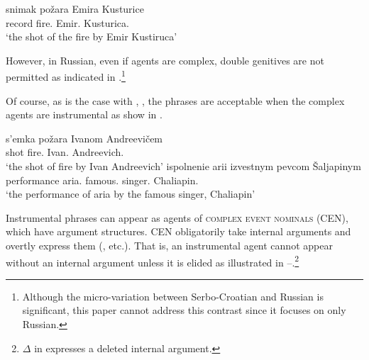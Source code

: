 \documentclass[output=paper,
]{langscibook}
\begin{document}
\begin{exe}
\ex\label{dgsc} %
\gll snimak požara Emira Kusturice\\
	record fire.{\GEN} Emir.{\GEN} Kusturica.{\GEN}\\
\trans `the shot of the fire by Emir Kustiruca'
\end{exe}

\noindent
However, in Russian, even if agents are complex, double genitives are not permitted as indicated in .\footnote{
			Although the micro-variation between Serbo-Croatian  and Russian  is significant, this paper cannot address this contrast since it focuses on only Russian.}

\begin{exe}
\ex\label{dgr} %
\begin{xlist}
\end{xlist}
\end{exe}

\noindent
Of course, as is the case with , , the phrases are acceptable when the complex agents are instrumental as show in .

\begin{exe}
\ex\label{gicom} %
\begin{xlist}
\ex
\gll s'emka požara Ivanom Andreevičem\\
	shot fire.{\GEN}	Ivan.{\INS} Andreevich.{\INS}\\
\trans  `the shot of fire by Ivan Andreevich' 
\ex
\gll ispolnenie arii izvestnym	 pevcom Šaljapinym\\
	performance aria.{\GEN} famous.{\INS} singer.{\INS} Chaliapin.{\INS}\\
\trans `the performance of aria by the famous singer, Chaliapin' 
\end{xlist}
\end{exe}

\noindent Instrumental phrases can appear as agents of \textsc{complex event nominals} (CEN), which have argument structures.  
CEN obligatorily take internal arguments and overtly express them (\citealt{Revzin1973, Schoorlemmer1998}, etc.). 
That is, an instrumental agent cannot appear without an internal argument unless it is elided as illustrated in --.\footnote{
			$\Delta$ in  expresses a deleted internal argument.			}
\end{document}

